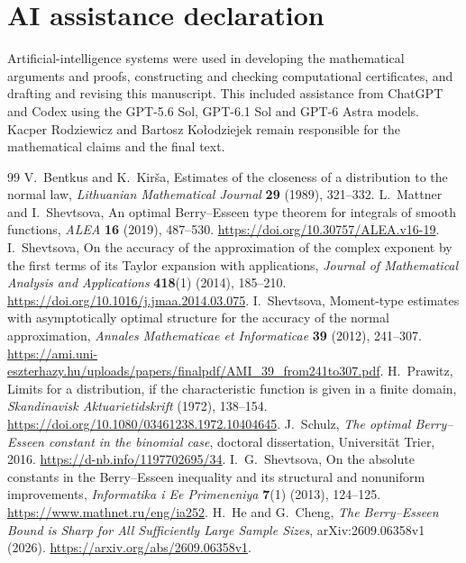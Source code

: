 \documentclass[11pt,a4paper]{article}
\numberwithin{equation}{section}
\theoremstyle{definition}
\theoremstyle{remark}
\begin{document}
\section*{AI assistance declaration}
Artificial-intelligence systems were used in developing the mathematical
arguments and proofs, constructing and checking computational certificates,
and drafting and revising this manuscript. This included assistance from
ChatGPT and Codex using the GPT-5.6 Sol, GPT-6.1 Sol and GPT-6 Astra models.
Kacper Rodziewicz and Bartosz
Ko{\l}odziejek remain responsible for the mathematical claims and the
final text.

\clearpage
\begin{thebibliography}{99}
V.~Bentkus and K.~Kir\v{s}a, Estimates of the closeness of a
distribution to the normal law, \emph{Lithuanian Mathematical Journal}
\textbf{29} (1989), 321--332.
L.~Mattner and I.~Shevtsova, An optimal Berry--Esseen type theorem
for integrals of smooth functions, \emph{ALEA} \textbf{16} (2019),
487--530. \url{https://doi.org/10.30757/ALEA.v16-19}.
I.~Shevtsova, On the accuracy of the approximation of the complex
exponent by the first terms of its Taylor expansion with applications,
\emph{Journal of Mathematical Analysis and Applications}
\textbf{418}(1) (2014), 185--210.
\url{https://doi.org/10.1016/j.jmaa.2014.03.075}.
I.~Shevtsova, Moment-type estimates with asymptotically optimal
structure for the accuracy of the normal approximation,
\emph{Annales Mathematicae et Informaticae} \textbf{39} (2012),
241--307.
\url{https://ami.uni-eszterhazy.hu/uploads/papers/finalpdf/AMI_39_from241to307.pdf}.
H.~Prawitz, Limits for a distribution, if the characteristic function
is given in a finite domain, \emph{Skandinavisk Aktuarietidskrift}
(1972), 138--154. \url{https://doi.org/10.1080/03461238.1972.10404645}.
J.~Schulz, \emph{The optimal Berry--Esseen constant in the binomial
case}, doctoral dissertation, Universit\"at Trier, 2016.
\url{https://d-nb.info/1197702695/34}.
I.~G.~Shevtsova, On the absolute constants in the Berry--Esseen
inequality and its structural and nonuniform improvements,
\emph{Informatika i Ee Primeneniya} \textbf{7}(1) (2013), 124--125.
\url{https://www.mathnet.ru/eng/ia252}.
H.~He and G.~Cheng, \emph{The Berry--Esseen Bound is Sharp for All
Sufficiently Large Sample Sizes}, arXiv:2609.06358v1 (2026).
\url{https://arxiv.org/abs/2609.06358v1}.

\end{thebibliography}
\end{document}
